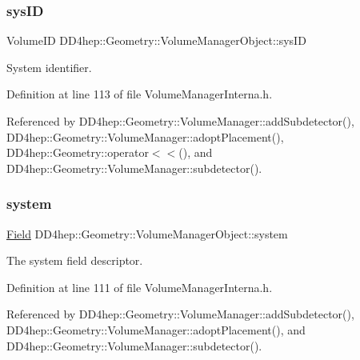 \subsubsection{\texorpdfstring{sys\+ID}{sysID}}
{\footnotesize\ttfamily Volume\+ID D\+D4hep\+::\+Geometry\+::\+Volume\+Manager\+Object\+::sys\+ID}



System identifier. 



Definition at line 113 of file Volume\+Manager\+Interna.\+h.



Referenced by D\+D4hep\+::\+Geometry\+::\+Volume\+Manager\+::add\+Subdetector(), D\+D4hep\+::\+Geometry\+::\+Volume\+Manager\+::adopt\+Placement(), D\+D4hep\+::\+Geometry\+::operator$<$$<$(), and D\+D4hep\+::\+Geometry\+::\+Volume\+Manager\+::subdetector().

\hypertarget{class_d_d4hep_1_1_geometry_1_1_volume_manager_object_ab53feb861c1eef621fbdb6350df70db0}{}\label{class_d_d4hep_1_1_geometry_1_1_volume_manager_object_ab53feb861c1eef621fbdb6350df70db0} 
\subsubsection{\texorpdfstring{system}{system}}
{\footnotesize\ttfamily \hyperlink{class_d_d4hep_1_1_geometry_1_1_volume_manager_object_ab214e2fe7df311a4a2e87ec17958790c}{Field} D\+D4hep\+::\+Geometry\+::\+Volume\+Manager\+Object\+::system}



The system field descriptor. 



Definition at line 111 of file Volume\+Manager\+Interna.\+h.



Referenced by D\+D4hep\+::\+Geometry\+::\+Volume\+Manager\+::add\+Subdetector(), D\+D4hep\+::\+Geometry\+::\+Volume\+Manager\+::adopt\+Placement(), and D\+D4hep\+::\+Geometry\+::\+Volume\+Manager\+::subdetector().

\hypertarget{class_d_d4hep_1_1_geometry_1_1_volume_manager_object_a2488dfe57afee14dd92f5f30a03f827f}{}\label{class_d_d4hep_1_1_geometry_1_1_volume_manager_object_a2488dfe57afee14dd92f5f30a03f827f} 
